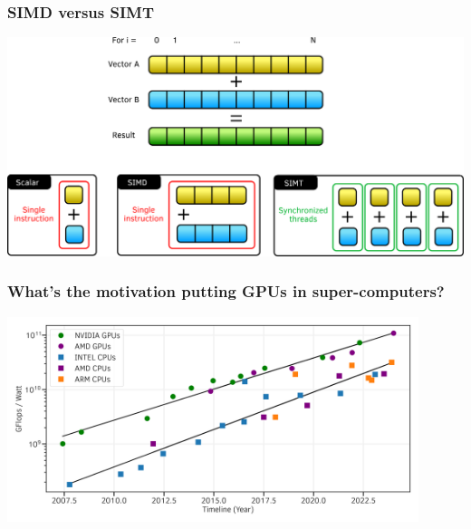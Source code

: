 \documentclass[aspectratio=169]{beamer}
\begin{document}

\begin{frame}
    \frametitle{SIMD versus SIMT}

    \begin{center}
        \includegraphics[width=\textwidth]{../../images/SIMD_vs_SIMT.png}
    \end{center}

\end{frame}


\begin{frame}
    \frametitle{What's the motivation putting GPUs in super-computers?}

\begin{center}
    \includegraphics[width=0.9\textwidth]{../../images/flop_watt_ratio_history_fp64.png}
\end{center}

\end{frame}

\end{document}
